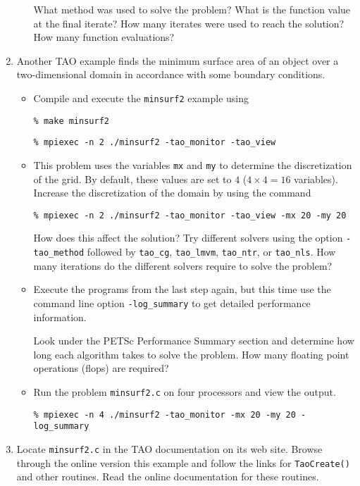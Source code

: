 \documentclass[11pt]{article}
\begin{document}
\begin{enumerate}
\begin{itemize}
  What method was used to solve the problem?
  What is the function value at the final iterate?
  How many iterates were used to reach the solution?
  How many function evaluations?

 \newpage

\end{itemize}

\item
Another TAO example finds the minimum surface area of an object over a
two-dimensional domain in accordance with some boundary conditions.

\begin{itemize}

\item
Compile and execute the \texttt{minsurf2} example using

\texttt{\% make minsurf2}

\texttt{\% mpiexec -n 2 ./minsurf2 -tao\_monitor -tao\_view}

\item
This problem uses the variables {\tt mx} and {\tt my} to determine
the discretization of the grid.  By default, these values are set to
$4$ ($4 \times 4 = 16$ variables). Increase the discretization of the
domain by using the command

\texttt{\% mpiexec -n 2 ./minsurf2 -tao\_monitor -tao\_view -mx 20 -my 20}

How does this affect the solution?
Try different solvers using the option \texttt{-tao\_method} followed by
\texttt{tao\_cg},
\texttt{tao\_lmvm}, \texttt{tao\_ntr}, or \texttt{tao\_nls}.
How many iterations do the different solvers require to solve the problem?


\item
Execute the programs from the last step again, but this time use the command line option
\texttt{-log\_summary} to get detailed performance information.

Look under the PETSc Performance Summary section and determine how long
each algorithm takes to solve the problem. How many floating point operations (flops) are required?


\item
Run the problem \texttt{minsurf2.c} on four processors and view the output.

\texttt{\% mpiexec -n 4 ./minsurf2 -tao\_monitor -mx 20 -my 20 -log\_summary}

\end{itemize}

\item
  Locate \texttt{minsurf2.c} in the TAO documentation on its web site.  Browse through
  the online version this example and follow the links for
  \texttt{TaoCreate()} and other routines.  Read the online documentation for these routines.


\end{enumerate}
\end{document}
